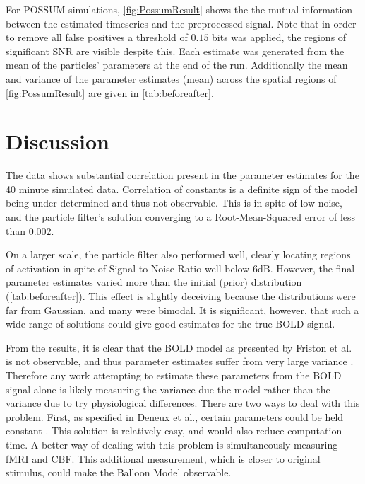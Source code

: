 \documentclass{article}
\begin{document}
For POSSUM simulations, \autoref{fig:PossumResult} shows the
the mutual information between the estimated timeseries and the 
preprocessed signal. Note that in order to remove all false
positives a threshold of $0.15$ bits was applied, 
the regions of significant SNR are visible despite this.
Each estimate was generated from the 
mean of the particles' parameters at the end of the run. 
Additionally the mean and variance of the parameter estimates
(mean) across the spatial regions of \autoref{fig:PossumResult} are
given in \autoref{tab:beforeafter}.

\section{Discussion}
\label{sec:Conclusion}
The data shows substantial correlation present in the parameter 
estimates for the 40 minute simulated data. Correlation of 
constants is a definite sign of the model being under-determined
and thus not observable. This is in spite of low noise, and the 
particle filter's solution converging to a Root-Mean-Squared error
of less than $0.002$. 

On a larger scale, the particle filter also performed well, clearly
locating regions of activation in spite of Signal-to-Noise Ratio 
well below 6dB. However, the final parameter estimates 
varied more than the initial (prior) distribution (\autoref{tab:beforeafter}).
This effect is slightly deceiving because the distributions
were far from Gaussian, and many were bimodal. It is 
significant, however, that such a wide range of solutions
could give good estimates for the true BOLD signal. 

From the results, it is clear that the BOLD model as presented
by Friston et al. is not observable, and thus parameter estimates
suffer from very large variance \cite{Friston2000}. Therefore
any work attempting to estimate these parameters from the BOLD
signal alone is likely measuring the variance due the model
rather than the variance due to try physiological differences. 
There are two ways to deal with this problem. First, as
specified in Deneux et al., certain parameters could be held constant
\cite{Deneux2006}. This solution is relatively easy, and would
also reduce computation time. A better way of dealing with this 
problem is simultaneously measuring fMRI and \ac{CBF}.  
This additional measurement, which is closer to 
original stimulus, could make the Balloon Model observable.
\end{document}
